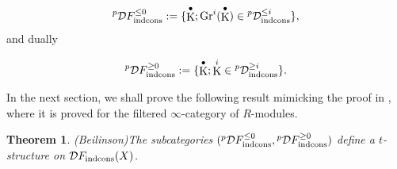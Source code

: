 \documentclass[12pt, reqno]{amsart}
\theoremstyle{plain}
\newtheorem{thm}{\bf Theorem}[subsection]
\theoremstyle{definition}
\theoremstyle{definition}
\newcommand{\cD}{{\mathcal D}}
\DeclareMathOperator{\KK}{K}
\begin{document}
\[
^p\cD F_{\textup{indcons}}^{\leq 0}:=\{\KK^{\bullet};\textup{Gr}^{i}(\KK^{\bullet}) \in{}^{p}\cD_{\textup{indcons}}^{\leq i}\},
\]
\noindent and dually

\[
^p\cD F_{\textup{indcons}}^{\geq 0}:=\{\KK^{\bullet};\KK^{i} \in{}^{p}\cD_{\textup{indcons}}^{\geq i}\}.
\]

In the next section, we shall prove the following result mimicking the proof in \cite[Theorem 5.3]{BMS19}, where it is proved for the filtered $\infty$-category of $R$-modules.

\begin{thm}(Beilinson)\label{Beilinson_t_structure}
    The subcategories $({}^p\cD F_{\textup{indcons}}^{\leq 0},{}^p\cD F_{\textup{indcons}}^{\geq 0})$ define a $t$-structure on $\cD F_{\textup{indcons}}(X)$.
\end{thm}
\end{document}
